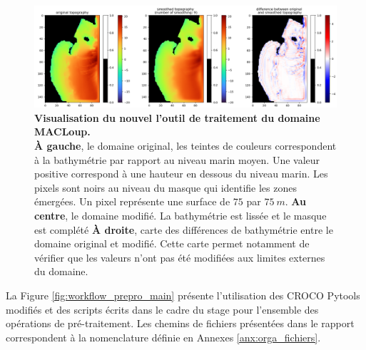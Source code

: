 \documentclass[10pt,a4paper,titlepage]{article}
\begin{document}
    \begin{figure}[h!]
        \centering
        \includegraphics[scale=0.35]{../images/grid_smoothing_adcl5_9.png}
        \caption{
            \textbf{Visualisation du nouvel l'outil de traitement du domaine MACLoup.}\\
            \textbf{À gauche}, le domaine original, les teintes de couleurs correspondent à la bathymétrie par rapport au niveau marin moyen.
            Une valeur positive correspond à une hauteur en dessous du niveau marin.
            Les pixels sont noirs au niveau du masque qui identifie les zones émergées.
            Un pixel représente une surface de $75$ par $75~m$.
            \textbf{Au centre}, le domaine modifié.
            La bathymétrie est lissée et le masque est complété
            \textbf{À droite}, carte des différences de bathymétrie entre le domaine original et modifié.
            Cette carte permet notamment de vérifier que les valeurs n'ont pas été modifiées aux limites externes du domaine.
        }
        \label{fig:new_smooth}
    \end{figure}
    
    La Figure \ref{fig:workflow_prepro_main} présente l'utilisation des CROCO Pytools modifiés et des scripts écrits dans le cadre du stage pour l'ensemble des opérations de pré-traitement.
    Les chemins de fichiers présentées dans le rapport correspondent à la nomenclature définie en Annexes \ref{anx:orga_fichiers}.
    
\end{document}
